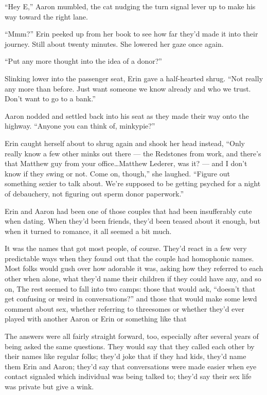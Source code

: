 ``Hey E,'' Aaron mumbled, the cat nudging the turn signal lever up to make his way toward the right lane.

``Mmm?'' Erin peeked up from her book to see how far they'd made it into their journey. Still about twenty minutes. She lowered her gaze once again.

``Put any more thought into the idea of a donor?''

Slinking lower into the passenger seat, Erin gave a half-hearted shrug. ``Not really any more than before. Just want someone we know already and who we trust. Don't want to go to a bank.''

Aaron nodded and settled back into his seat as they made their way onto the highway. ``Anyone you can think of, minkypie?''

Erin caught herself about to shrug again and shook her head instead, ``Only really know a few other minks out there --- the Redstones from work, and there's that Matthew guy from your office\ldots{}Matthew Lederer, was it? --- and I don't know if they swing or not. Come on, though,'' she laughed. ``Figure out something sexier to talk about. We're supposed to be getting psyched for a night of debauchery, not figuring out sperm donor paperwork.''

Erin and Aaron had been one of those couples that had been insufferably cute when dating. When they'd been friends, they'd been teased about it enough, but when it turned to romance, it all seemed a bit much.

It was the names that got most people, of course. They'd react in a few very predictable ways when they found out that the couple had homophonic names. Most folks would gush over how adorable it was, asking how they referred to each other when alone, what they'd name their children if they could have any, and so on, The rest seemed to fall into two camps: those that would ask, ``doesn't that get confusing or weird in conversations?'' and those that would make some lewd comment about sex, whether referring to threesomes or whether they'd ever played with another Aaron or Erin or something like that

The answers were all fairly straight forward, too, especially after several years of being asked the same questions. They would say that they called each other by their names like regular folks; they'd joke that if they had kids, they'd name them Erin and Aaron; they'd say that conversations were made easier when eye contact signaled which individual was being talked to; they'd say their sex life was private but give a wink.

